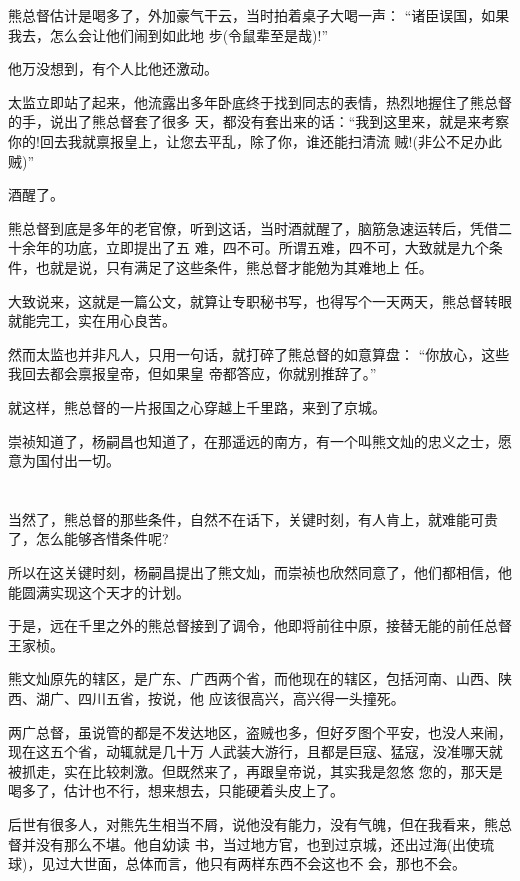 \documentclass[11pt,a4paper,onecolumn]{article}
\begin{document}
熊总督估计是喝多了，外加豪气干云，当时拍着桌子大喝一声： ``诸臣误国，如果我去，怎么会让他们闹到如此地
步(令鼠辈至是哉)!''

他万没想到，有个人比他还激动。

太监立即站了起来，他流露出多年卧底终于找到同志的表情，热烈地握住了熊总督的手，说出了熊总督套了很多
天，都没有套出来的话：``我到这里来，就是来考察你的!回去我就禀报皇上，让您去平乱，除了你，谁还能扫清流
贼!(非公不足办此贼)''

酒醒了。

熊总督到底是多年的老官僚，听到这话，当时酒就醒了，脑筋急速运转后，凭借二十余年的功底，立即提出了五
难，四不可。所谓五难，四不可，大致就是九个条件，也就是说，只有满足了这些条件，熊总督才能勉为其难地上
任。

大致说来，这就是一篇公文，就算让专职秘书写，也得写个一天两天，熊总督转眼就能完工，实在用心良苦。

然而太监也并非凡人，只用一句话，就打碎了熊总督的如意算盘： ``你放心，这些我回去都会禀报皇帝，但如果皇
帝都答应，你就别推辞了。''

就这样，熊总督的一片报国之心穿越上千里路，来到了京城。

崇祯知道了，杨嗣昌也知道了，在那遥远的南方，有一个叫熊文灿的忠义之士，愿意为国付出一切。

\section[\thesection]{}

当然了，熊总督的那些条件，自然不在话下，关键时刻，有人肯上，就难能可贵了，怎么能够吝惜条件呢?

所以在这关键时刻，杨嗣昌提出了熊文灿，而崇祯也欣然同意了，他们都相信，他能圆满实现这个天才的计划。

于是，远在千里之外的熊总督接到了调令，他即将前往中原，接替无能的前任总督王家桢。

熊文灿原先的辖区，是广东、广西两个省，而他现在的辖区，包括河南、山西、陕西、湖广、四川五省，按说，他
应该很高兴，高兴得一头撞死。

两广总督，虽说管的都是不发达地区，盗贼也多，但好歹图个平安，也没人来闹，现在这五个省，动辄就是几十万
人武装大游行，且都是巨寇、猛寇，没准哪天就被抓走，实在比较刺激。但既然来了，再跟皇帝说，其实我是忽悠
您的，那天是喝多了，估计也不行，想来想去，只能硬着头皮上了。

后世有很多人，对熊先生相当不屑，说他没有能力，没有气魄，但在我看来，熊总督并没有那么不堪。他自幼读
书，当过地方官，也到过京城，还出过海(出使琉球)，见过大世面，总体而言，他只有两样东西不会\myrule 这也不
会，那也不会。
\end{document}
